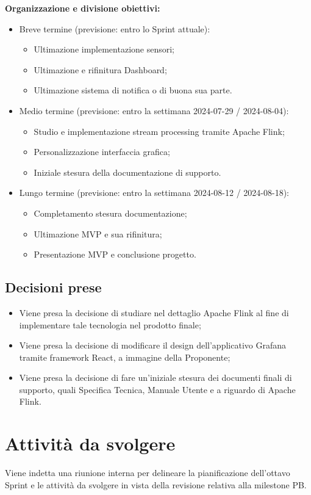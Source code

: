 \documentclass[8pt]{article}
\newcommand{\signatureline}[1]{%
	 \par\vspace{0.5cm}
	\noindent\makebox[\linewidth][r]{\rule{0.2\textwidth}{0.5pt}\hspace{3cm}\makebox[0pt][r]{\vspace{3pt}\footnotesize #1}}%
}
\begin{document}
\textbf{Organizzazione e divisione obiettivi:}
\begin{itemize}
\setlength\itemsep{0em}
    \item Breve termine (previsione: entro lo Sprint attuale):
    \begin{itemize}
    \setlength\itemsep{0em}
        \item Ultimazione implementazione sensori;
        \item Ultimazione e rifinitura Dashboard;
        \item Ultimazione sistema di notifica o di buona sua parte.
    \end{itemize}
    \item Medio termine (previsione: entro la settimana 2024-07-29 / 2024-08-04):
    \begin{itemize}
    \setlength\itemsep{0em}
        \item Studio e implementazione stream processing tramite Apache Flink;
        \item Personalizzazione interfaccia grafica;
        \item Iniziale stesura della documentazione di supporto.
    \end{itemize}
    \item Lungo termine (previsione: entro la settimana 2024-08-12 / 2024-08-18):
    \begin{itemize}
    \setlength\itemsep{0em}
        \item Completamento stesura documentazione;
        \item Ultimazione MVP e sua rifinitura;
        \item Presentazione MVP e conclusione progetto.
    \end{itemize}
\end{itemize}
\subsection{Decisioni prese}
\begin{itemize}
	\setlength\itemsep{0em}
	\item Viene presa la decisione di studiare nel dettaglio Apache Flink al fine di implementare tale tecnologia nel prodotto finale;
	\item Viene presa la decisione di modificare il design dell'applicativo Grafana tramite framework React, a immagine della Proponente;
	\item Viene presa la decisione di fare un'iniziale stesura dei documenti finali di supporto, quali Specifica Tecnica, Manuale Utente e a riguardo di Apache Flink.
\end{itemize}
\newpage
\section{Attività da svolgere}
Viene indetta una riunione interna per delineare la pianificazione dell'ottavo Sprint e le attività da svolgere in vista della revisione relativa alla milestone PB.
\signatureline{Padova, 2024-08-12}
\end{document}
